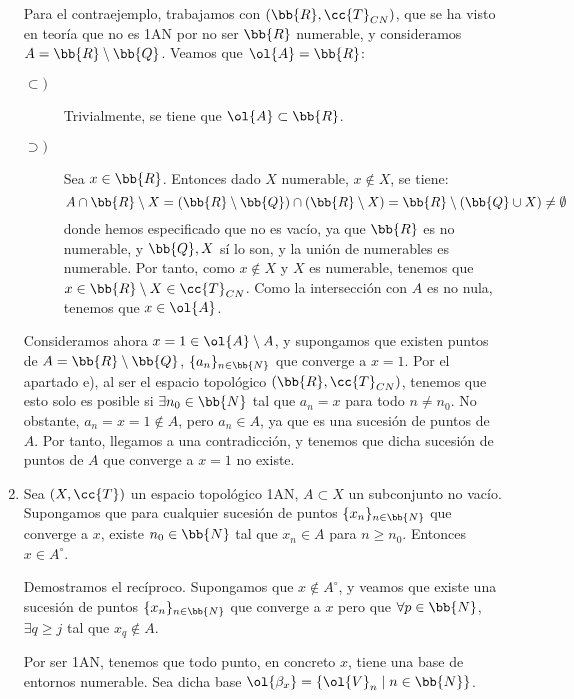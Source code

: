 \begin{ejercicio}
\begin{enumerate}[label=\alph*)]
        Para el contraejemplo, trabajamos con $(\bb{R},\cc{T}_{CN})$, que se ha visto en teoría que no es 1AN por no ser $\bb{R}$ numerable, y consideramos $A=\bb{R}\setminus \bb{Q}$. Veamos que $\ol{A} = \bb{R}$:
        \begin{description}
            \item[$\subset)$] Trivialmente, se tiene que $\ol{A}\subset \bb{R}$.
            \item[$\supset)$] Sea $x\in \bb{R}$. Entonces dado $X$ numerable, $x\notin X$, se tiene:
            \begin{equation*}
                A\cap \bb{R}\setminus X = (\bb{R}\setminus \bb{Q})\cap (\bb{R}\setminus X)
                = \bb{R}\setminus (\bb{Q}\cup X) \neq \emptyset
            \end{equation*}
            donde hemos especificado que no es vacío, ya que $\bb{R}$ es no numerable, y $\bb{Q},X$ sí lo son, y la unión de numerables es numerable. Por tanto, como $x\notin X$ y $X$ es numerable, tenemos que $x\in \bb{R}\setminus X\in \cc{T}_{CN}$. Como la intersección con $A$ es no nula, tenemos que $x\in \ol{A}$.
        \end{description}
        
        Consideramos ahora $x=1\in \ol{A}\setminus A$, y supongamos que existen puntos de $A=\bb{R}\setminus \bb{Q}$, $\{a_n\}_{n\in \bb{N}}$ que converge a $x=1$. Por el apartado e), al ser el espacio topológico $(\bb{R},\cc{T}_{CN})$, tenemos que esto solo es posible si $\exists n_0\in \bb{N}$ tal que $a_n=x$ para todo $n\neq n_0$. No obstante, $a_n=x=1\notin A$, pero $a_n\in A$, ya que es una sucesión de puntos de $A$. Por tanto, llegamos a una contradicción, y tenemos que dicha sucesión de puntos de $A$ que converge a $x=1$ no existe.

        \item Sea $(X,\cc{T})$ un espacio topológico 1AN, $A\subset X$ un subconjunto no vacío. Supongamos que para cualquier sucesión de puntos $\{x_n\}_{n\in \bb{N}}$ que converge a $x$, existe $n_0\in \bb{N}$ tal que $x_n\in A$ para $n\geq n_0$. Entonces $x\in A^\circ$.

        Demostramos el recíproco. Supongamos que $x\notin A^\circ$, y veamos que existe una sucesión de puntos $\{x_n\}_{n\in \bb{N}}$ que converge a $x$ pero que $\forall p\in \bb{N}$, $\exists q\geq j$ tal que $x_q\notin A$.

        Por ser 1AN, tenemos que todo punto, en concreto $x$, tiene una base de entornos numerable. Sea dicha base $\ol{\beta_x}=\{\ol{V}_n\mid n\in \bb{N}\}$.


\end{enumerate}
\end{ejercicio}
